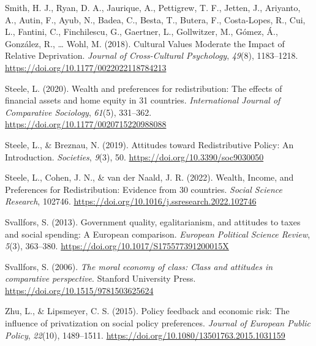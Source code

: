 \documentclass[
  12pt,
]{book}
\newlength{\cslhangindent}
\newlength{\cslentryspacingunit} %
\newenvironment{CSLReferences}[2] %
 {%
  \setlength{\parindent}{0pt}
  \ifodd #1
  \let\oldpar\par
  \def\par{\hangindent=\cslhangindent\oldpar}
  \fi
  \setlength{\parskip}{#2\cslentryspacingunit}
 }%
 {}
\begin{document}
\begin{CSLReferences}{1}{0}
\leavevmode{}%
Smith, H. J., Ryan, D. A., Jaurique, A., Pettigrew, T. F., Jetten, J., Ariyanto, A., Autin, F., Ayub, N., Badea, C., Besta, T., Butera, F., Costa-Lopes, R., Cui, L., Fantini, C., Finchilescu, G., Gaertner, L., Gollwitzer, M., Gómez, Á., González, R., \ldots{} Wohl, M. (2018). Cultural {Values Moderate} the {Impact} of {Relative Deprivation}. \emph{Journal of Cross-Cultural Psychology}, \emph{49}(8), 1183--1218. \url{https://doi.org/10.1177/0022022118784213}

\leavevmode{}%
Steele, L. (2020). Wealth and preferences for redistribution: {The} effects of financial assets and home equity in 31 countries. \emph{International Journal of Comparative Sociology}, \emph{61}(5), 331--362. \url{https://doi.org/10.1177/0020715220988088}

\leavevmode{}%
Steele, L., \& Breznau, N. (2019). Attitudes toward {Redistributive Policy}: {An Introduction}. \emph{Societies}, \emph{9}(3), 50. \url{https://doi.org/10.3390/soc9030050}

\leavevmode{}%
Steele, L., Cohen, J. N., \& van der Naald, J. R. (2022). Wealth, {Income}, and {Preferences} for {Redistribution}: {Evidence} from 30 countries. \emph{Social Science Research}, 102746. \url{https://doi.org/10.1016/j.ssresearch.2022.102746}

\leavevmode{}%
Svallfors, S. (2013). Government quality, egalitarianism, and attitudes to taxes and social spending: A {European} comparison. \emph{European Political Science Review}, \emph{5}(3), 363--380. \url{https://doi.org/10.1017/S175577391200015X}

\leavevmode{}%
Svallfors, S. (2006). \emph{The moral economy of class: {Class} and attitudes in comparative perspective}. {Stanford University Press}. \url{https://doi.org/10.1515/9781503625624}

\leavevmode{}%
Zhu, L., \& Lipsmeyer, C. S. (2015). Policy feedback and economic risk: The influence of privatization on social policy preferences. \emph{Journal of European Public Policy}, \emph{22}(10), 1489--1511. \url{https://doi.org/10.1080/13501763.2015.1031159}

\end{CSLReferences}
\end{document}
